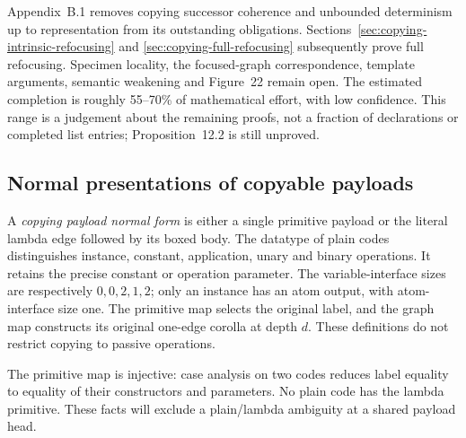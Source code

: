 Appendix~B.1 removes copying successor coherence and unbounded determinism up
to representation from its outstanding obligations.
Sections~\ref{sec:copying-intrinsic-refocusing} and
\ref{sec:copying-full-refocusing} subsequently prove full refocusing.
Specimen locality, the focused-graph correspondence, template arguments,
semantic weakening and Figure~22 remain open. The estimated completion is roughly
55--70\% of mathematical effort, with low confidence. This range is a judgement
about the remaining proofs, not a fraction of declarations or completed list
entries; Proposition~12.2 is still unproved.

\subsection{Normal presentations of copyable payloads}

A \emph{copying payload normal form} is either a single primitive payload or
the literal lambda edge followed by its boxed body. The datatype of plain
codes distinguishes instance, constant, application, unary and binary
operations. It retains the precise constant or operation parameter.
The variable-interface sizes are respectively $0,0,2,1,2$; only an instance
has an atom output, with atom-interface size one. The primitive map selects
the original label, and the graph map constructs its original one-edge corolla
at depth $d$. These definitions do not restrict copying to passive operations.






The primitive map is injective: case analysis on two codes reduces label
equality to equality of their constructors and parameters. No plain code has
the lambda primitive. These facts will exclude a plain/lambda ambiguity at a
shared payload head.



